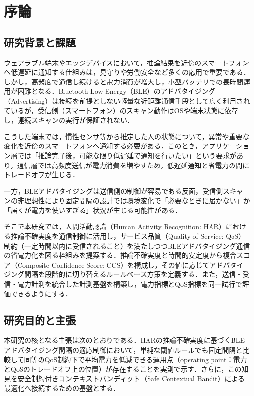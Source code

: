 \chapter{序論}
\label{ch:introduction}
\clearpage

\section{研究背景と課題}
ウェアラブル端末やエッジデバイスにおいて，推論結果を近傍のスマートフォンへ低遅延に通知する仕組みは，見守りや労働安全など多くの応用で重要である．しかし，高頻度で通信し続けると電力消費が増大し，小型バッテリでの長時間運用が困難となる．Bluetooth Low Energy（BLE）のアドバタイジング（Advertising）は接続を前提としない軽量な近距離通信手段として広く利用されているが，受信側（スマートフォン）のスキャン動作はOSや端末状態に依存し，連続スキャンの実行が保証されない．

こうした端末では，慣性センサ等から推定した人の状態について，異常や重要な変化を近傍のスマートフォンへ通知する必要がある．このとき，アプリケーション層では「推論完了後，可能な限り低遅延で通知を行いたい」という要求があり，通信層では高頻度送信が電力消費を増やすため，低遅延通知と省電力の間にトレードオフが生じる．

一方，BLEアドバタイジングは送信側の制御が容易である反面，受信側スキャンの非理想性により固定間隔の設計では環境変化で「必要なときに届かない」か「届くが電力を使いすぎる」状況が生じる可能性がある．

そこで本研究では，人間活動認識（Human Activity Recognition: HAR）における推論不確実度を通信制御に活用し，サービス品質（Quality of Service: QoS）制約（一定時間以内に受信されること）を満たしつつBLEアドバタイジング通信の省電力化を図る枠組みを提案する．推論不確実度と時間的安定度から複合スコア（Composite Confidence Score: CCS）を構成し，その値に応じてアドバタイジング間隔を段階的に切り替えるルールベース方策を定義する．また，送信・受信・電力計測を統合した計測基盤を構築し，電力指標とQoS指標を同一試行で評価できるようにする．

\section{研究目的と主張}
本研究の核となる主張は次の\mbox{とおりである}．HARの推論不確実度に基づくBLEアドバタイジング間隔の適応制御において，単純な閾値ルールでも固定間隔と比較して同等のQoS制約下で平均電力を低減できる運用点（operating point：電力とQoSのトレードオフ上の位置）が存在することを実測で示す．さらに，この知見を安全制約付きコンテキストバンディット（Safe Contextual Bandit）による最適化へ接続するための基盤とする．

